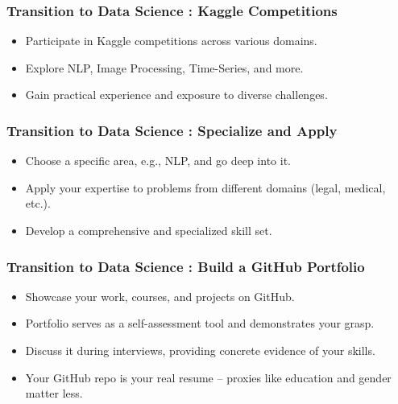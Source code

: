 \begin{frame}[fragile]\frametitle{Transition to Data Science : Kaggle Competitions}

        \begin{itemize}
            \item Participate in Kaggle competitions across various domains.
            \item Explore NLP, Image Processing, Time-Series, and more.
            \item Gain practical experience and exposure to diverse challenges.
        \end{itemize}
			
\end{frame}

\begin{frame}[fragile]\frametitle{Transition to Data Science : Specialize and Apply}

        \begin{itemize}
            \item Choose a specific area, e.g., NLP, and go deep into it.
            \item Apply your expertise to problems from different domains (legal, medical, etc.).
            \item Develop a comprehensive and specialized skill set.
        \end{itemize}
			
\end{frame}

\begin{frame}[fragile]\frametitle{Transition to Data Science : Build a GitHub Portfolio}


        \begin{itemize}
            \item Showcase your work, courses, and projects on GitHub.
            \item Portfolio serves as a self-assessment tool and demonstrates your grasp.
            \item Discuss it during interviews, providing concrete evidence of your skills.
            \item Your GitHub repo is your real resume – proxies like education and gender matter less.
        \end{itemize}
			
\end{frame}

